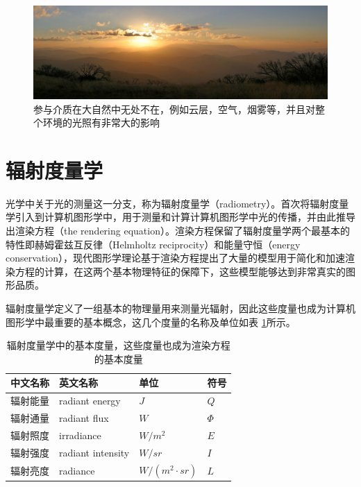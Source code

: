 \begin{figure}
	\includegraphics[width=1.0\textwidth]{figures/intro/Participating-media}
	\caption{参与介质在大自然中无处不在，例如云层，空气，烟雾等，并且对整个环境的光照有非常大的影响}
	\label{f:intro-Participating-media}
\end{figure}




\section{辐射度量学}
光学中关于光的测量这一分支，称为辐射度量学（radiometry）。\cite{a:TheRenderingEquation}首次将辐射度量学引入到计算机图形学中，用于测量和计算计算机图形学中光的传播，并由此推导出渲染方程（the rendering equation）。渲染方程保留了辐射度量学两个最基本的特性即赫姆霍兹互反律（Helmholtz reciprocity）和能量守恒（energy conservation），现代图形学理论基于渲染方程提出了大量的模型用于简化和加速渲染方程的计算，在这两个基本物理特征的保障下，这些模型能够达到非常真实的图形品质。

辐射度量学定义了一组基本的物理量用来测量光辐射，因此这些度量也成为计算机图形学中最重要的基本概念，这几个度量的名称及单位如表 \ref{t:radiometric-quantities}所示。

\begin{table}
\caption{辐射度量学中的基本度量，这些度量也成为渲染方程的基本度量}
\label{t:radiometric-quantities}

\begin{tabular}{p{}|p{}|p{}|p{}}
\hline
   中文名称&英文名称&单位&符号  \\
  \hline
  辐射能量&radiant energy & $J$& $Q$\\
  辐射通量&radiant flux & $W$  & $\Phi$\\
  辐射照度&irradiance & $W/m^2$ & $E$\\
  辐射强度&radiant intensity & $W/sr$ & $I$\\
  辐射亮度&radiance & $W/(m^2\cdot sr)$& $L$\\
\hline
\end{tabular}
\end{table}


